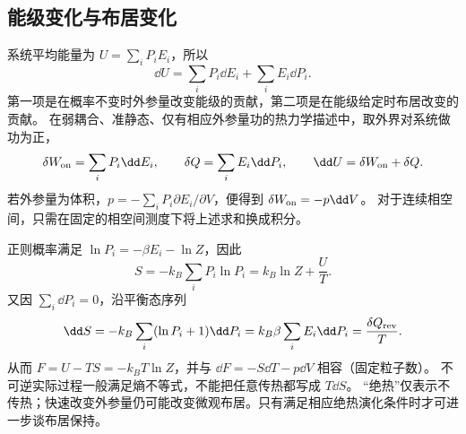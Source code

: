 \subsection{能级变化与布居变化}

系统平均能量为 $U=\sum_iP_iE_i$，所以
\begin{equation}
 \dd U=\sum_iP_i\dd E_i+\sum_iE_i\dd P_i.
\end{equation}
第一项是在概率不变时外参量改变能级的贡献，第二项是在能级给定时布居改变的贡献。
在弱耦合、准静态、仅有相应外参量功的热力学描述中，取外界对系统做功为正，
\[\delta W_{\rm on}=\sum_iP_i\dd E_i,\qquad
\delta Q=\sum_iE_i\dd P_i,\qquad \dd U=\delta W_{\rm on}+\delta Q.\]
若外参量为体积，$p=-\sum_iP_i\partial E_i/\partial V$，便得到 $\delta W_{\rm on}=-p\dd V$。
对于连续相空间，只需在固定的相空间测度下将上述求和换成积分。

正则概率满足 $\ln P_i=-\beta E_i-\ln Z$，因此
\[S=-k_B\sum_iP_i\ln P_i=k_B\ln Z+\frac UT.\]
又因 $\sum_i\dd P_i=0$，沿平衡态序列
\[\dd S=-k_B\sum_i(\ln P_i+1)\dd P_i
=k_B\beta\sum_iE_i\dd P_i=\frac{\delta Q_{\rm rev}}T.\]
从而 $F=U-TS=-k_BT\ln Z$，并与 $\dd F=-S\dd T-p\dd V$ 相容（固定粒子数）。
不可逆实际过程一般满足熵不等式，不能把任意传热都写成 $T\dd S$。
“绝热”仅表示不传热；快速改变外参量仍可能改变微观布居。只有满足相应绝热演化条件时才可进一步谈布居保持。
